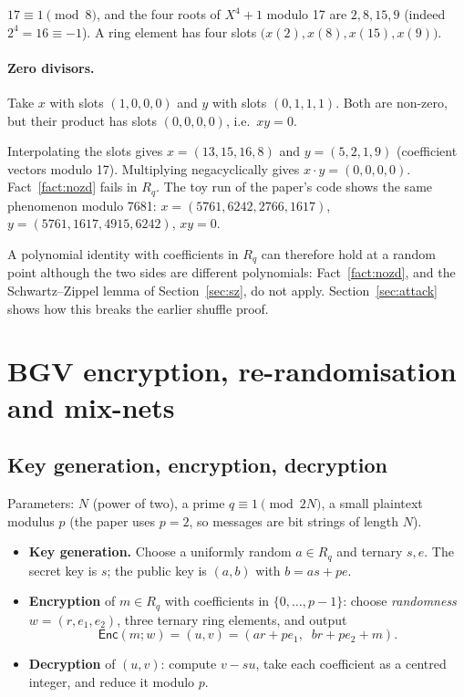 \documentclass[11pt,a4paper]{article}
\newcommand{\Z}{\mathbb{Z}}
\newcommand{\Rq}{R_q}
\newcommand{\Enc}{\mathsf{Enc}}
\theoremstyle{definition}
\theoremstyle{plain}
\begin{document}
\begin{example}[{Slots of $\Z_{17}[X]/(X^4+1)$}]
$17\equiv 1\pmod 8$, and the four roots of $X^4+1$ modulo 17 are $2,8,15,9$ (indeed
$2^4=16\equiv-1$). A ring element has four slots $\bigl(x(2),x(8),x(15),x(9)\bigr)$.
\end{example}

\paragraph{Zero divisors.} Take $x$ with slots $(1,0,0,0)$ and $y$ with slots $(0,1,1,1)$. Both are
non-zero, but their product has slots $(0,0,0,0)$, i.e.\ $xy=0$.

\begin{example}
Interpolating the slots gives $x=(13,15,16,8)$ and $y=(5,2,1,9)$ (coefficient vectors modulo 17).
Multiplying negacyclically gives $x\cdot y=(0,0,0,0)$. Fact~\ref{fact:nozd} fails in $\Rq$.
The toy run of the paper's code shows the same phenomenon modulo 7681:
$x=(5761,6242,2766,1617)$, $y=(5761,1617,4915,6242)$, $xy=0$.
\end{example}

\begin{caution}
A polynomial identity with coefficients in $\Rq$ can therefore hold at a random point although the
two sides are different polynomials: Fact~\ref{fact:nozd}, and the Schwartz--Zippel lemma of
Section~\ref{sec:sz}, do not apply. Section~\ref{sec:attack} shows how this breaks the earlier
shuffle proof.
\end{caution}

\section{BGV encryption, re-randomisation and mix-nets}
\label{sec:bgv}

\subsection{Key generation, encryption, decryption}

Parameters: $N$ (power of two), a prime $q\equiv 1\pmod{2N}$, a small plaintext modulus $p$
(the paper uses $p=2$, so messages are bit strings of length $N$).

\begin{itemize}[leftmargin=1.3em]
\item \textbf{Key generation.} Choose a uniformly random $a\in\Rq$ and ternary $s,e$. The secret key is
  $s$; the public key is $(a,b)$ with $b=as+pe$.
\item \textbf{Encryption} of $m\in\Rq$ with coefficients in $\{0,\dots,p-1\}$: choose
  \emph{randomness} $w=(r,e_1,e_2)$, three ternary ring elements, and output
  \[
    \Enc(m;w)=(u,v)=(ar+pe_1,\;\; br+pe_2+m).
  \]
\item \textbf{Decryption} of $(u,v)$: compute $v-su$, take each coefficient as a centred integer, and
  reduce it modulo $p$.
\end{itemize}
\end{document}
